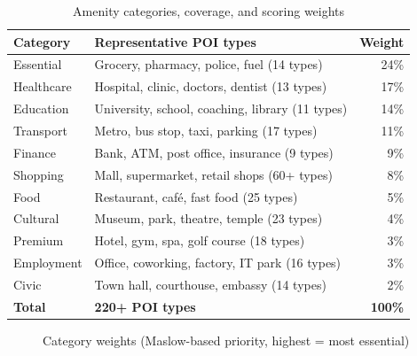 \documentclass[11pt,a4paper]{article}
\begin{document}
\begin{table}[H]
\centering
\caption{Amenity categories, coverage, and scoring weights}
\begin{tabular}{@{}llr@{}}
\toprule
\textbf{Category} & \textbf{Representative POI types} & \textbf{Weight} \\ \midrule
Essential   & Grocery, pharmacy, police, fuel (14 types)          & 24\% \\
Healthcare  & Hospital, clinic, doctors, dentist (13 types)       & 17\% \\
Education   & University, school, coaching, library (11 types)    & 14\% \\
Transport   & Metro, bus stop, taxi, parking (17 types)           & 11\% \\
Finance     & Bank, ATM, post office, insurance (9 types)         & 9\%  \\
Shopping    & Mall, supermarket, retail shops (60+ types)         & 8\%  \\
Food        & Restaurant, caf\'{e}, fast food (25 types)          & 5\%  \\
Cultural    & Museum, park, theatre, temple (23 types)            & 4\%  \\
Premium     & Hotel, gym, spa, golf course (18 types)             & 3\%  \\
Employment  & Office, coworking, factory, IT park (16 types)      & 3\%  \\
Civic       & Town hall, courthouse, embassy (14 types)           & 2\%  \\ \midrule
\textbf{Total} & \textbf{220+ POI types} & \textbf{100\%} \\ \bottomrule
\end{tabular}
\end{table}

\begin{figure}[H]
\centering
{}
\caption{Category weights (Maslow-based priority, highest = most essential)}
\end{figure}
\end{document}
